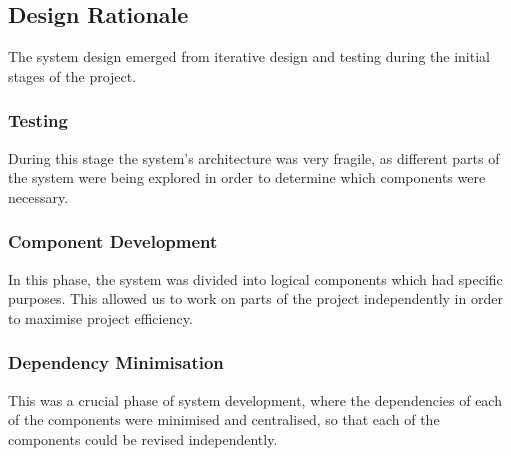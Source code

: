 \subsection{Design Rationale}
The system design emerged from iterative design and testing during the initial stages of the project.

\subsubsection{Testing}
During this stage the system's architecture was very fragile, as different parts of the system were being explored in order to determine which components were necessary.

\subsubsection{Component Development}
In this phase, the system was divided into logical components which had specific purposes. This allowed us to work on parts of the project independently in order to maximise project efficiency.

\subsubsection{Dependency Minimisation}
This was a crucial phase of system development, where the dependencies of each of the components were minimised and centralised, so that each of the components could be revised independently.